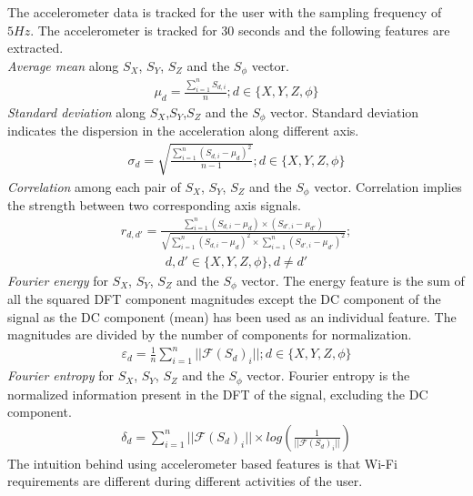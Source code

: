 The accelerometer data is tracked for the user with the sampling frequency of $5Hz$. The accelerometer is tracked for 30 seconds and the following features are extracted. \\
\emph{Average mean} along $S_X$, $S_Y$, $S_Z$ and the $S_\phi$ vector.
\begin{align*}
\mu_d = \frac{\sum_{i=1}^n S_{d,i}}{n}; d \in \{X, Y, Z, \phi\}
\end{align*}
\emph{Standard deviation} along $S_X$,$S_Y$,$S_Z$ and the $S_\phi$ vector. Standard deviation indicates the dispersion in the acceleration along different axis.
\begin{align*}
\sigma_d = \sqrt{\frac{\sum_{i=1}^n (S_{d,i} - \mu_d)^2 }{n-1}} ; d \in \{X, Y, Z, \phi\}
\end{align*}
\emph{Correlation} among each pair of $S_X$, $S_Y$, $S_Z$ and the $S_\phi$ vector. Correlation implies the strength between two corresponding axis signals.
\begin{align*}
r_{d,d'} = \frac{\sum_{i=1}^n (S_{d,i}-\mu_d) \times (S_{d',i}-\mu_{d'}) }{\sqrt{\sum_{i=1}^n (S_{d,i}-\mu_d)^2 \times \sum_{i=1}^n (S_{d',i}-\mu_{d'})^2}} ;
\end{align*}
\begin{align*}
 d,d' \in \{X, Y, Z, \phi\} , d \neq d'
\end{align*}
\emph{Fourier energy} for $S_X$, $S_Y$, $S_Z$ and the $S_\phi$ vector. The energy feature is the sum of all the squared DFT component magnitudes
except the DC component of the signal as the DC component (mean) has been used as an individual feature. The magnitudes are divided by the number of components for normalization.
\begin{align*}
\varepsilon_d = \frac{1}{n}\sum_{i=1}^n || \mathcal{F}(S_d)_i||; d \in \{X,Y,Z,\phi\}
\end{align*}
\emph{Fourier entropy} for $S_X$, $S_Y$, $S_Z$ and the $S_\phi$ vector. Fourier entropy is the normalized information present in the DFT of the signal, excluding the DC component.
\begin{align*}
\delta_d = \sum_{i=1}^n ||\mathcal{F}(S_d)_i|| \times log (\frac{1}{|| \mathcal{F}(S_d)_i||})
\end{align*}
The intuition behind using accelerometer based features is that Wi-Fi requirements are different during different activities of the user.

